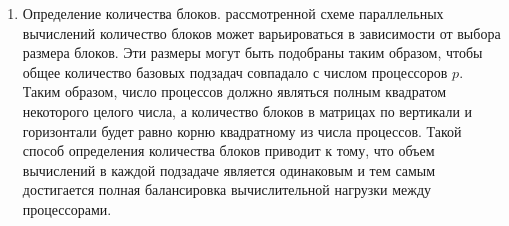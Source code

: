 \documentclass{report}
\begin{document}
\begin{enumerate}
    \item Определение количества блоков.
     рассмотренной схеме параллельных вычислений количество блоков может варьироваться в зависимости от выбора размера блоков. Эти размеры могут быть подобраны таким образом, чтобы общее количество базовых подзадач совпадало с числом процессоров {\itshape $p$}. Таким образом, число процессов должно являться полным квадратом некоторого целого числа, а количество блоков в матрицах по вертикали и горизонтали будет равно корню квадратному из числа процессов. Такой способ определения количества блоков приводит к тому, что объем вычислений в каждой подзадаче является одинаковым и тем самым достигается полная балансировка вычислительной нагрузки между процессорами.
\end{enumerate}

\newpage

\end{document}
